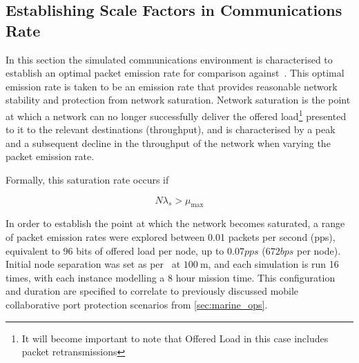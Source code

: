 \subsection{Establishing Scale Factors in Communications Rate}

In this section the simulated communications environment is characterised to establish an optimal packet emission rate for comparison against~\cite{Guo11}.
This optimal emission rate is taken to be an emission rate that provides reasonable network stability and protection from network saturation.
Network saturation is the point at which a network can no longer successfully deliver the offered load\footnote{It will become important to note that Offered Load in this case includes packet retransmissions} presented to it to the relevant destinations (throughput), and is characterised by a peak and a subsequent decline in the throughput of the network when varying the packet emission rate. 


Formally, this saturation rate occurs if

\begin{equation}
N\lambda_s>\mu_\text{max}
\end{equation}


In order to establish the point at which the network becomes saturated, a range of packet emission rates were explored between 0.01 packets per second (pps), equivalent to 96 bits of offered load per node, up to $0.07 pps$ ($672 bps$ per node).
Initial node separation was set as per~\citet{Guo11} at $\SI{100}{\meter}$, and each simulation is run 16 times, with each instance modelling a 8 hour mission time.
This configuration and duration are specified to correlate to previously discussed mobile collaborative port protection scenarios from \autoref{sec:marine_ops}.

